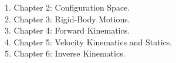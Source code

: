 \documentclass[preview]{standalone}
\begin{document}
1. Chapter 2: Configuration Space.\\2. Chapter 3: Rigid-Body Motions.\\3. Chapter 4: Forward Kinematics.\\4. Chapter 5: Velocity Kinematics and Statics.\\5. Chapter 6: Inverse Kinematics.\\
\end{document}
